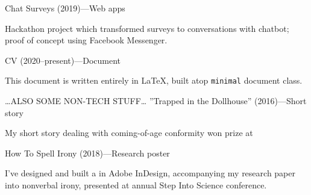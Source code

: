 %
\begin{minipage}[t]{\linewidth}\vspace{\subsectionSpace}
{\rSubtitleFont\bold Chat Surveys \medium(2019)---Web apps \href{https://github.com/Runtime-T-error}{\faGithub}}\newline
\vspace{\ribbonTopMargin}
\ribbonR \ribbonTidyverse \ribbonPostgres \ribbonJava \ribbonSpringBoot\newline

{\contentFont Hackathon project which transformed surveys to conversations with chatbot; proof of concept using Facebook Messenger.}
\end{minipage}\newline%
%
\begin{minipage}[t]{\linewidth}\vspace{\subsectionSpace}
{\rSubtitleFont\bold CV \medium(2020--present)---Document \href{https://github.com/luka-j/CV}{\faGithub}}\newline
\vspace{\ribbonTopMargin}
\ribbonLatex \ribbonFontAwesome \newline

{\contentFont This document is written entirely in \LaTeX, built atop \texttt{minimal} document class.}
\end{minipage}\newline%
%
\begin{minipage}{\linewidth}\vspace{5mm}
{\subtitleFont\light \ldots ALSO SOME NON-TECH STUFF\ldots}\vspace{1mm}\linebreak\newline
{\vspace{\subsectionSpace}\rSubtitleFont\bold ''Trapped in the Dollhouse'' \medium(2016)---Short story}\linebreak

{\vspace{-8mm}\contentFont My short story dealing with coming-of-age conformity won  prize at }
\end{minipage}\newline%
%
\begin{minipage}[t]{\linewidth}
{\vspace{\subsectionSpace}\rSubtitleFont\bold How To Spell Irony \medium(2018)---Research poster}\linebreak

{\vspace{-4mm}\contentFont I've designed and built a  in Adobe InDesign, accompanying my research paper into nonverbal irony, presented at  annual Step Into Science conference.}
\end{minipage}\newline%